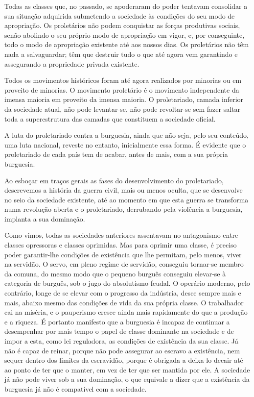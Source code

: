 Todas as classes que, no passado, se apoderaram do poder tentavam
consolidar a sua situação adquirida submetendo a sociedade às
condições do seu modo de apropriação. Os proletários não podem
conquistar as forças produtivas sociais, senão abolindo o seu próprio
modo de apropriação em vigor, e, por conseguinte, todo o modo de
apropriação existente até aos nossos dias. Os proletários não têm nada
a salvaguardar; têm que destruir tudo o que até agora vem garantindo e
assegurando a propriedade privada existente.

Todos os movimentos históricos foram até agora realizados por minorias
ou em proveito de minorias. O movimento proletário é o movimento
independente da imensa maioria em proveito da imensa maioria. O
proletariado, camada inferior da sociedade atual, não pode
levantar-se, não pode revoltar-se sem fazer saltar toda a
superestrutura das camadas que constituem a sociedade oficial.

A luta do proletariado contra a burguesia, ainda que não seja, pelo
seu conteúdo, uma luta nacional, reveste no entanto, inicialmente essa
forma. É evidente que o proletariado de cada país tem de acabar, antes
de mais, com a sua própria burguesia.

Ao esboçar em traços gerais as fases do desenvolvimento do
proletariado, descrevemos a história da guerra civil, mais ou menos
oculta, que se desenvolve no seio da sociedade existente, até ao
momento em que esta guerra se transforma numa revolução aberta e o
proletariado, derrubando pela violência a burguesia, implanta a sua
dominação.

Como vimos, todas as sociedades anteriores assentavam no antagonismo
entre classes opressoras e classes oprimidas. Mas para oprimir uma
classe, é preciso poder garantir-lhe condições de existência que lhe
permitam, pelo menos, viver na servidão. O servo, em pleno regime de
servidão, conseguiu tornar-se membro da comuna, do mesmo modo que o
pequeno burguês conseguiu elevar-se à categoria de burguês, sob o jugo
do absolutismo feudal. O operário moderno, pelo contrário, longe de se
elevar com o progresso da indústria, desce sempre mais e mais, abaixo
mesmo das condições de vida da sua própria classe. O trabalhador cai
na miséria, e o pauperismo cresce ainda mais rapidamente do que a
produção e a riqueza. É portanto manifesto que a burguesia é incapaz
de continuar a desempenhar por mais tempo o papel de classe dominante
na sociedade e de impor a esta, como lei reguladora, as condições de
existência da sua classe. Já não é capaz de reinar, porque não pode
assegurar ao escravo a existência, nem sequer dentro dos limites da
escravidão, porque é obrigada a deixa-lo decair até ao ponto de ter
que o manter, em vez de ter que ser mantida por ele. A sociedade já
não pode viver sob a sua dominação, o que equivale a dizer que a
existência da burguesia já não é compatível com a sociedade.

